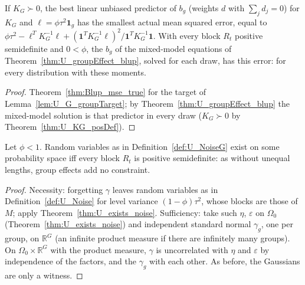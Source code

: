 \begin{theorem}\label{thm:U_G_groupEffect_mse}
  \leanok
  If $K_G \succ 0$, the best linear unbiased predictor of $b_g$ (weights $d$ with
  $\sum_j d_j = 0$) for $K_G$ and $\ell = \phi\tau^2\mathbf 1_g$ has the smallest actual mean
  squared error, equal to $\phi\tau^2 - \ell^TK_G^{-1}\ell + (\mathbf 1^TK_G^{-1}\ell)^2 /
  \mathbf 1^TK_G^{-1}\mathbf 1$. With every block $R_t$ positive semidefinite and $0 < \phi$, the
  $\hat b_g$ of the mixed-model equations of Theorem~\ref{thm:U_groupEffect_blup}, solved for
  each draw, has this error: for every distribution with these moments.
\end{theorem}
\begin{proof}
  \leanok
  Theorem~\ref{thm:Blup_mse_true} for the target of Lemma~\ref{lem:U_G_groupTarget}; by
  Theorem~\ref{thm:U_groupEffect_blup} the mixed-model solution is that predictor in every draw
  ($K_G \succ 0$ by Theorem~\ref{thm:U_KG_posDef}).
\end{proof}

\begin{theorem}\label{thm:U_G_exists_noise}
  \leanok
  Let $\phi < 1$. Random variables as in Definition~\ref{def:U_NoiseG} exist on
  some probability space iff every block $R_t$ is positive semidefinite: as
  without unequal lengths, group effects add no constraint.
\end{theorem}
\begin{proof}
  \leanok
  Necessity: forgetting $\gamma$ leaves random variables as in
  Definition~\ref{def:U_Noise} for level variance $(1-\phi)\tau^2$, whose
  blocks are those of $M$; apply Theorem~\ref{thm:U_exists_noise}. Sufficiency: take such
  $\eta$, $\varepsilon$ on $\Omega_0$ (Theorem~\ref{thm:U_exists_noise}) and
  independent standard normal $\gamma_g$, one per group, on $\mathbb{R}^G$
  (an infinite product measure if there are infinitely many groups). On
  $\Omega_0 \times \mathbb{R}^G$ with the product measure, $\gamma$ is
  uncorrelated with $\eta$ and $\varepsilon$ by independence of the factors,
  and the $\gamma_g$ with each other. As before, the Gaussians are only a
  witness.
\end{proof}
